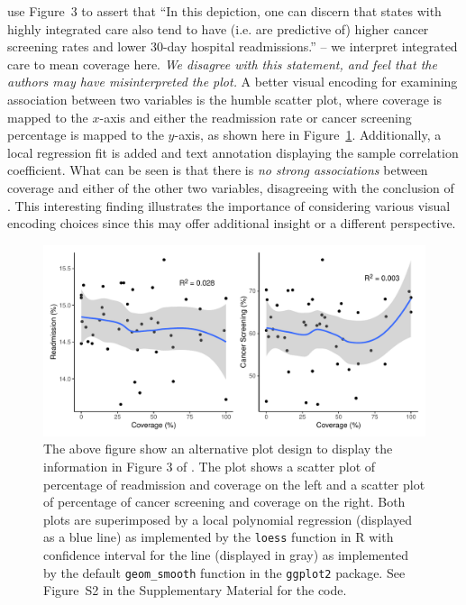 \documentclass[ijds,nonblindrev]{informs-ijds}
\begin{document}
\citet{basole2021} use Figure~3 to assert that ``In this depiction, one can discern that states with highly integrated care also tend to have (i.e. are predictive of) higher cancer screening rates and lower 30-day hospital readmissions.'' --  we interpret integrated care to mean coverage here. {\em We disagree with this statement, and feel that the authors may have misinterpreted the plot.} A better visual encoding for examining association between two variables is the humble scatter plot, where coverage is mapped to the $x$-axis and either the readmission rate or cancer screening percentage is mapped to the $y$-axis, as shown here in Figure~\ref{fig:fig3-alt-with-line}. Additionally, a local regression fit is added and text annotation displaying the sample correlation coefficient. What can be seen is that there is {\em no strong associations} between coverage and either of the other two variables, disagreeing with the conclusion of \citet{basole2021}. This interesting finding illustrates the importance of considering various visual encoding choices since this may offer additional insight or a different perspective.

\begin{figure}[h!]
    \centering
    \includegraphics[width = \textwidth]{fig3-alt-1.pdf}
    \caption{The above figure show an alternative plot design to display the information in Figure 3 of \citet{basole2021}. The plot shows a scatter plot of percentage of readmission and coverage on the left and a scatter plot of percentage of cancer screening and coverage on the right. Both plots are superimposed by a local polynomial regression (displayed as a blue line) as implemented by the \texttt{loess} function in R with confidence interval for the line (displayed in gray) as implemented by the default \texttt{geom\_smooth} function in the \texttt{ggplot2} package. See Figure~S2 in the Supplementary Material for the code.}
    \label{fig:fig3-alt-with-line}
\end{figure}
\end{document}
